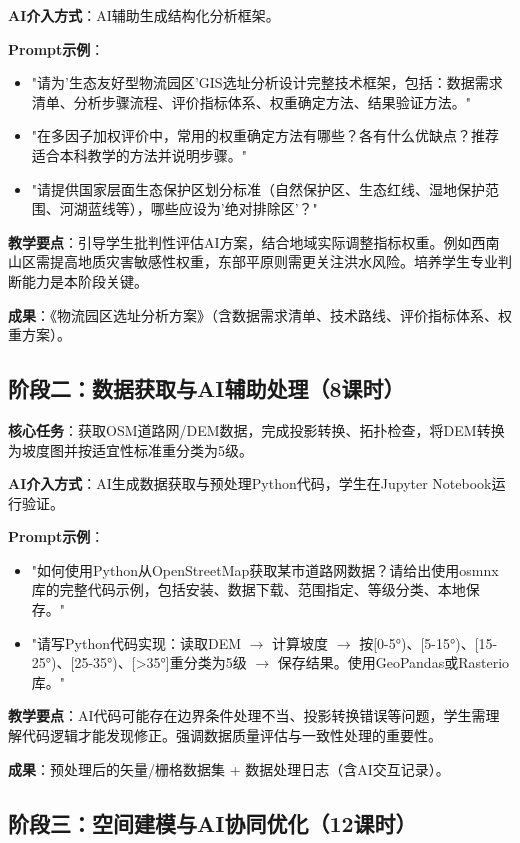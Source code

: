 \documentclass[12pt, a4paper]{article}
\begin{document}
\textbf{AI介入方式}：AI辅助生成结构化分析框架。

\textbf{Prompt示例}：
\begin{itemize}
\item "请为'生态友好型物流园区'GIS选址分析设计完整技术框架，包括：数据需求清单、分析步骤流程、评价指标体系、权重确定方法、结果验证方法。"
\item "在多因子加权评价中，常用的权重确定方法有哪些？各有什么优缺点？推荐适合本科教学的方法并说明步骤。"
\item "请提供国家层面生态保护区划分标准（自然保护区、生态红线、湿地保护范围、河湖蓝线等），哪些应设为'绝对排除区'？"
\end{itemize}

\textbf{教学要点}：引导学生批判性评估AI方案，结合地域实际调整指标权重。例如西南山区需提高地质灾害敏感性权重，东部平原则需更关注洪水风险。培养学生专业判断能力是本阶段关键。

\textbf{成果}：《物流园区选址分析方案》（含数据需求清单、技术路线、评价指标体系、权重方案）。

\subsection{阶段二：数据获取与AI辅助处理（8课时）}

\textbf{核心任务}：获取OSM道路网/DEM数据，完成投影转换、拓扑检查，将DEM转换为坡度图并按适宜性标准重分类为5级。

\textbf{AI介入方式}：AI生成数据获取与预处理Python代码，学生在Jupyter Notebook运行验证。

\textbf{Prompt示例}：
\begin{itemize}
\item "如何使用Python从OpenStreetMap获取某市道路网数据？请给出使用osmnx库的完整代码示例，包括安装、数据下载、范围指定、等级分类、本地保存。"
\item "请写Python代码实现：读取DEM $\rightarrow$ 计算坡度 $\rightarrow$ 按[0-5°)、[5-15°)、[15-25°)、[25-35°)、[>35°]重分类为5级 $\rightarrow$ 保存结果。使用GeoPandas或Rasterio库。"
\end{itemize}

\textbf{教学要点}：AI代码可能存在边界条件处理不当、投影转换错误等问题，学生需理解代码逻辑才能发现修正。强调数据质量评估与一致性处理的重要性。

\textbf{成果}：预处理后的矢量/栅格数据集 + 数据处理日志（含AI交互记录）。

\subsection{阶段三：空间建模与AI协同优化（12课时）}
\end{document}
